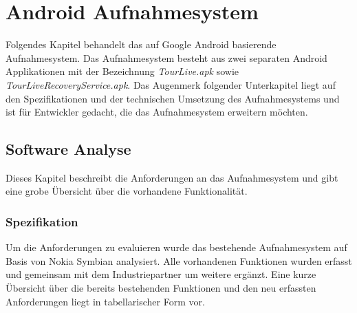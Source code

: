 \chapter{Android Aufnahmesystem}
\label{sec:androidaufnahmesystem}

Folgendes Kapitel behandelt das auf Google Android basierende Aufnahmesystem. Das Aufnahmesystem besteht aus zwei separaten Android Applikationen mit der Bezeichnung \textit{TourLive.apk} sowie \textit{TourLiveRecoveryService.apk}. Das Augenmerk folgender Unterkapitel liegt auf den Spezifikationen und der technischen Umsetzung des Aufnahmesystems und ist für Entwickler gedacht, die das Aufnahmesystem erweitern möchten.

\section{Software Analyse}
Dieses Kapitel beschreibt die Anforderungen an das Aufnahmesystem und gibt eine grobe  Übersicht über die vorhandene Funktionalität.

\subsection{Spezifikation}

Um die Anforderungen zu evaluieren wurde das bestehende Aufnahmesystem auf Basis von Nokia Symbian analysiert. Alle vorhandenen Funktionen wurden erfasst und gemeinsam mit dem Industriepartner um weitere ergänzt. 
Eine kurze Übersicht über die bereits bestehenden Funktionen und den neu erfassten Anforderungen liegt in tabellarischer Form vor.

